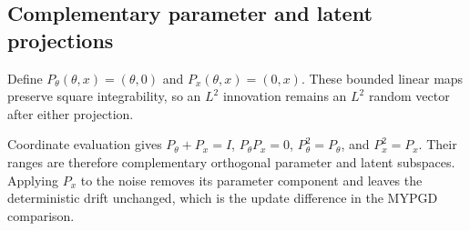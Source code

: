 \documentclass[11pt,a4paper]{report}
\begin{document}
\subsection{\texorpdfstring{Complementary parameter and latent projections}{Complementary parameter and latent projections}}
\label{report-step-ProximalLangevin-MYPGDNoise-lean-1}


Define \(P_\theta(\theta,x)=(\theta,0)\) and \(P_x(\theta,x)=(0,x)\). These bounded linear maps preserve square integrability, so an \(L^2\) innovation remains an \(L^2\) random vector after either projection.



Coordinate evaluation gives \(P_\theta+P_x=I\), \(P_\theta P_x=0\), \(P_\theta^2=P_\theta\), and \(P_x^2=P_x\). Their ranges are therefore complementary orthogonal parameter and latent subspaces. Applying \(P_x\) to the noise removes its parameter component and leaves the deterministic drift unchanged, which is the update difference in the MYPGD comparison.
\end{document}
